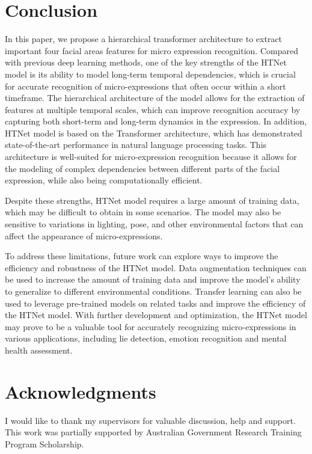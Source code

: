 \documentclass[review,12pt, 3p]{elsarticle}
\begin{document}
\section {Conclusion}
In this paper, we propose a hierarchical transformer architecture to extract important four facial areas features for micro expression recognition. Compared with previous deep learning methods, one of the key strengths of the HTNet model is its ability to model long-term temporal dependencies, which is crucial for accurate recognition of micro-expressions that often occur within a short timeframe. The hierarchical architecture of the model allows for the extraction of features at multiple temporal scales, which can improve recognition accuracy by capturing both short-term and long-term dynamics in the expression. In addition, HTNet model is based on the Transformer architecture, which has demonstrated state-of-the-art performance in natural language processing tasks. This architecture is well-suited for micro-expression recognition because it allows for the modeling of complex dependencies between different parts of the facial expression, while also being computationally efficient. 

Despite these strengths, HTNet model requires a large amount of training data, which may be difficult to obtain in some scenarios. The model may also be sensitive to variations in lighting, pose, and other environmental factors that can affect the appearance of micro-expressions. 

To address these limitations, future work can explore ways to improve the efficiency and robustness of the  HTNet model. Data augmentation techniques can be used to increase the amount of training data and improve the model's ability to generalize to different environmental conditions. Transfer learning can also be used to leverage pre-trained models on related tasks and improve the efficiency of the  HTNet model. With further development and optimization, the HTNet model may prove to be a valuable tool for accurately recognizing micro-expressions in various applications, including lie detection, emotion recognition and mental health assessment.


\section*{Acknowledgments}
I would like to thank my supervisors for valuable discussion, help and support. This work was partially supported by Australian Government Research Training Program Scholarship.
\end{document}
